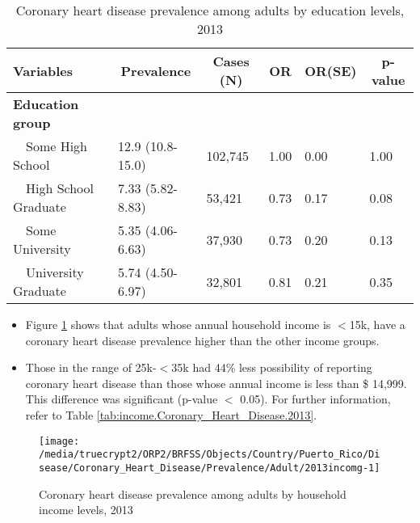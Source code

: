 \begin{table}[H]
\caption{Coronary heart disease prevalence  among adults by education levels, 2013\label{tab:edu.Coronary_Heart_Disease.2013}} 
\begin{center}
\begin{tabular}{llllll}
\hline\hline
\multicolumn{1}{l}{Variables}&\multicolumn{1}{c}{Prevalence}&\multicolumn{1}{c}{Cases (N)}&\multicolumn{1}{c}{OR}&\multicolumn{1}{c}{OR(SE)}&\multicolumn{1}{c}{p-value}\tabularnewline
\hline
{\bfseries Education group}&&&&&\tabularnewline
~~Some High School&12.9 (10.8-15.0)&102,745&1.00&0.00&1.00\tabularnewline
~~High School Graduate&7.33 (5.82-8.83)& 53,421&0.73&0.17&0.08\tabularnewline
~~Some University&5.35 (4.06-6.63)& 37,930&0.73&0.20&0.13\tabularnewline
~~University Graduate&5.74 (4.50-6.97)& 32,801&0.81&0.21&0.35\tabularnewline
\hline
\end{tabular}\end{center}

\end{table}

 
 
 \newpage
\begin{itemize}

\item Figure \ref{fig:income.Coronary_Heart_Disease.2013} shows that adults whose annual household income is 
$<$15k, have a coronary heart disease prevalence higher than the other income groups.

\item Those in the range of 25k-$<$35k had 44\% less possibility of reporting coronary heart disease than those whose annual income is less than \$ 14,999. This difference was significant (p-value $<$ 0.05).  For further information, refer to Table \ref{tab:income.Coronary_Heart_Disease.2013}.

\end{itemize}

\begin{figure}[H]
\caption{Coronary heart disease prevalence among adults by household income levels, 
         2013}
\begin{knitrout}
\color{fgcolor}

{\centering \texttt{[image: /media/truecrypt2/ORP2/BRFSS/Objects/Country/Puerto\_Rico/Disease/Coronary\_Heart\_Disease/Prevalence/Adult/2013incomg-1]} 

}



\end{knitrout}
 \label{fig:income.Coronary_Heart_Disease.2013}
\end{figure}

